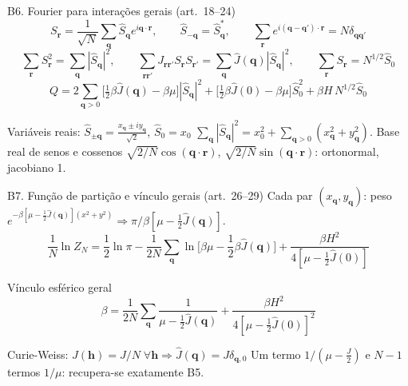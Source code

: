 \documentclass[10pt,aspectratio=169]{beamer}
\newcommand{\eq}[1]{\textcolor{qcdBlue!70!black}{\small(#1)}}
\begin{document}
\begin{frame}{B6. Fourier para interações gerais \eq{art.~18--24}}
  \small
  \[S_{\mathbf r}=\frac1{\sqrt N}\sum_{\mathbf q}\hat S_{\mathbf q}e^{i\mathbf q\cdot\mathbf r},\qquad
    \hat S_{-\mathbf q}=\hat S_{\mathbf q}^*,\qquad\sum_{\mathbf r}e^{i(\mathbf q-\mathbf q')\cdot\mathbf r}=N\delta_{\mathbf q\mathbf q'}\]
  \[\sum_{\mathbf r}S_{\mathbf r}^2=\sum_{\mathbf q}|\hat S_{\mathbf q}|^2,\qquad
    \sum_{\mathbf r\mathbf r'}J_{\mathbf r\mathbf r'}S_{\mathbf r}S_{\mathbf r'}=\sum_{\mathbf q}\hat J(\mathbf q)|\hat S_{\mathbf q}|^2,\qquad
    \sum_{\mathbf r}S_{\mathbf r}=N^{1/2}\hat S_0\]
  \[Q=2\sum_{\mathbf q>0}\Big[\tfrac12\beta\hat J(\mathbf q)-\beta\mu\Big]|\hat S_{\mathbf q}|^2
    +\Big[\tfrac12\beta\hat J(0)-\beta\mu\Big]\hat S_0^2+\beta H\,N^{1/2}\hat S_0\]
  \begin{block}{Variáveis reais: $\hat S_{\pm\mathbf q}=\frac{x_{\mathbf q}\pm iy_{\mathbf q}}{\sqrt2}$, $\hat S_0=x_0$}
    $\sum_{\mathbf q}|\hat S_{\mathbf q}|^2=x_0^2+\sum_{\mathbf q>0}(x_{\mathbf q}^2+y_{\mathbf q}^2)$.
    Base real de senos e cossenos $\sqrt{2/N}\cos(\mathbf q\cdot\mathbf r)$, $\sqrt{2/N}\sin(\mathbf q\cdot\mathbf r)$: ortonormal, jacobiano 1.
  \end{block}
\end{frame}

\begin{frame}{B7. Função de partição e vínculo gerais \eq{art.~26--29}}
  \small
  Cada par $(x_{\mathbf q},y_{\mathbf q})$: peso $e^{-\beta[\mu-\frac12\hat J(\mathbf q)](x^2+y^2)}\Rightarrow\pi/\beta[\mu-\frac12\hat J(\mathbf q)]$.
  \[\frac1N\ln Z_N=\frac12\ln\pi-\frac1{2N}\sum_{\mathbf q}\ln\Big[\beta\mu-\frac12\beta\hat J(\mathbf q)\Big]+\frac{\beta H^2}{4[\mu-\frac12\hat J(0)]}\]
  \begin{block}{Vínculo esférico geral}
    \[\beta=\frac1{2N}\sum_{\mathbf q}\frac1{\mu-\frac12\hat J(\mathbf q)}+\frac{\beta H^2}{4[\mu-\frac12\hat J(0)]^2}\]
  \end{block}
  \begin{block}{Curie-Weiss: $J(\mathbf h)=J/N\;\forall\mathbf h\Rightarrow\hat J(\mathbf q)=J\delta_{\mathbf q,0}$}
    Um termo $1/(\mu-\frac J2)$ e $N-1$ termos $1/\mu$: recupera-se exatamente B5.
  \end{block}
\end{frame}
\end{document}
